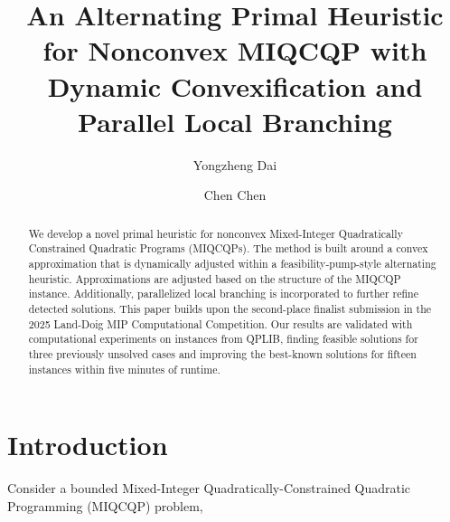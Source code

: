 \documentclass[]{article}
\begin{document}
\newcommand{\red}{\color{red}}
\newcommand{\blue}{\color{blue}}
\newcommand{\green}{\color{green}}
\allowdisplaybreaks

\title{An Alternating Primal Heuristic for Nonconvex MIQCQP with Dynamic Convexification and Parallel Local Branching}
\author[1]{Yongzheng Dai}
\author[2]{Chen Chen}
\date{}
\maketitle

\begin{abstract}
We develop a novel primal heuristic for nonconvex Mixed-Integer Quadratically Constrained Quadratic Programs (MIQCQPs). The method is built around a convex approximation that is dynamically adjusted within a feasibility-pump-style alternating heuristic. Approximations are adjusted based on the structure of the MIQCQP instance.  Additionally, parallelized local branching is incorporated to further refine detected solutions. This paper builds upon the second-place finalist submission in the 2025 Land-Doig MIP Computational Competition. Our results are validated with computational experiments on instances from QPLIB, finding feasible solutions for three previously unsolved cases and improving the best-known solutions for fifteen instances within five minutes of runtime.
\end{abstract}


\section{Introduction}\label{sec:intro}

Consider a bounded Mixed-Integer Quadratically-Constrained Quadratic Programming (MIQCQP) problem,
\end{document}
